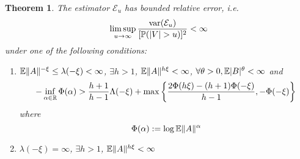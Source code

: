 \documentclass{article}
\newtheorem{theorem}{Theorem}
\theoremstyle{remark}
\begin{document}
\begin{theorem}
  The estimator $\mathcal E_u$ has bounded relative error, i.e.
  \begin{equation*}
    \limsup_{u \to \infty} {\text{var}(\mathcal E_u) \over [\mathbb{P}(|V| > u)]^2} < \infty
  \end{equation*}
  under one of the following conditions:
  \begin{enumerate}
  \item $\mathbb{E} \|A\|^{-\xi} \leq \lambda(-\xi) < \infty$, $\exists h > 1$,
    $\mathbb{E}\|A\|^{h\xi} < \infty$,
    $\forall \theta > 0, \mathbb{E} |B|^{\theta} < \infty$ and
    \begin{equation}
      \label{eq:deepness}
      -\inf_{\alpha \in \mathbb R} \Phi(\alpha)
      >
      {
        h+1
        \over
        h-1
      } \Lambda(-\xi)
      +
      \max\left\{
      {
        2 \Phi(h\xi) - (h+1) \Phi(-\xi)
        \over
        h-1
      },
      -\Phi(-\xi)
      \right\}
    \end{equation}
    where
    \[
    \Phi(\alpha) := \log \mathbb{E} \|A\|^{\alpha}
    \]
    \label{assumptions:1}
  \item $\lambda(-\xi) = \infty$, $\exists h > 1$,
    $\mathbb{E}\|A\|^{h\xi} < \infty$
    \label{assumptions:2}    
  \end{enumerate}
\end{theorem}
\end{document}
